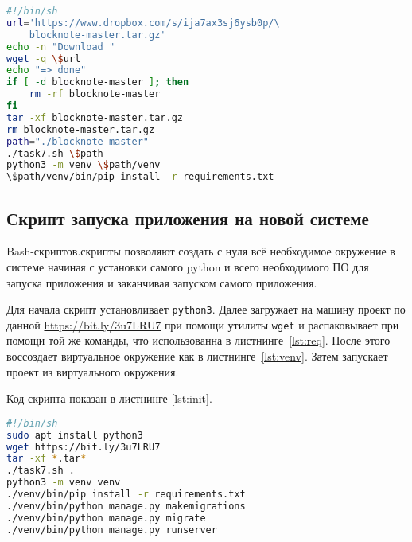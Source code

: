 \begin{lstlisting}[language=Bash
	, caption=\leftline{Создание виртуального окружения}
	, label=lst:venv]
#!/bin/sh
url='https://www.dropbox.com/s/ija7ax3sj6ysb0p/\
	blocknote-master.tar.gz'
echo -n "Download "
wget -q \$url
echo "=> done"
if [ -d blocknote-master ]; then
	rm -rf blocknote-master
fi
tar -xf blocknote-master.tar.gz
rm blocknote-master.tar.gz
path="./blocknote-master"
./task7.sh \$path
python3 -m venv \$path/venv
\$path/venv/bin/pip install -r requirements.txt
\end{lstlisting}

\subsection{Скрипт запуска приложения на новой системе}
Bash-скриптов.скрипты позволяют создать с нуля всё необходимое окружение в
системе начиная с установки самого python и всего необходимого ПО для
запуска приложения и заканчивая запуском самого приложения.\par
Для начала скрипт установливает \texttt{python3}.
Далее загружает на машину проект по данной \url{https://bit.ly/3u7LRU7}
при помощи утилиты \texttt{wget} и распаковывает при помощи той же команды,
что использованна в листнинге~\ref{lst:req}.
После этого воссоздает виртуальное окружение как в листнинге~\ref{lst:venv}.
Затем запускает проект из виртуального окружения.\par
Код скрипта показан в листнинге \ref{lst:init}.

\begin{lstlisting}[language=Bash
	, caption=\leftline{Создание стартового скрипта}
	, label=lst:init]
#!/bin/sh
sudo apt install python3
wget https://bit.ly/3u7LRU7
tar -xf *.tar*
./task7.sh .
python3 -m venv venv
./venv/bin/pip install -r requirements.txt
./venv/bin/python manage.py makemigrations
./venv/bin/python manage.py migrate
./venv/bin/python manage.py runserver
\end{lstlisting}

